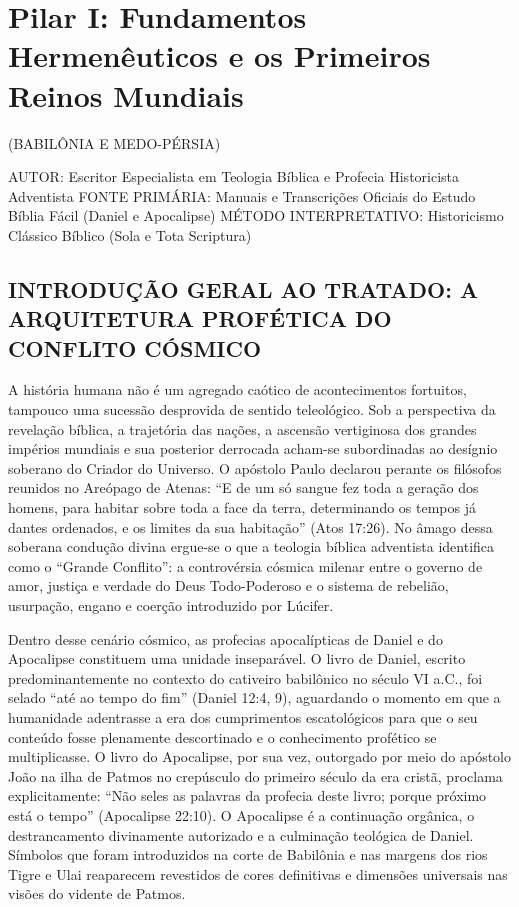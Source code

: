 \chapter{Pilar I: Fundamentos Hermenêuticos e os Primeiros Reinos Mundiais}




(BABILÔNIA E MEDO-PÉRSIA)

AUTOR: Escritor Especialista em Teologia Bíblica e Profecia Historicista Adventista
FONTE PRIMÁRIA: Manuais e Transcrições Oficiais do Estudo Bíblia Fácil (Daniel e Apocalipse)
MÉTODO INTERPRETATIVO: Historicismo Clássico Bíblico (Sola e Tota Scriptura)


\section{INTRODUÇÃO GERAL AO TRATADO: A ARQUITETURA PROFÉTICA DO CONFLITO CÓSMICO}


A história humana não é um agregado caótico de acontecimentos fortuitos, tampouco uma sucessão desprovida de sentido teleológico. Sob a perspectiva da revelação bíblica, a trajetória das nações, a ascensão vertiginosa dos grandes impérios mundiais e sua posterior derrocada acham-se subordinadas ao desígnio soberano do Criador do Universo. O apóstolo Paulo declarou perante os filósofos reunidos no Areópago de Atenas: ``E de um só sangue fez toda a geração dos homens, para habitar sobre toda a face da terra, determinando os tempos já dantes ordenados, e os limites da sua habitação'' (Atos 17:26). No âmago dessa soberana condução divina ergue-se o que a teologia bíblica adventista identifica como o ``Grande Conflito'': a controvérsia cósmica milenar entre o governo de amor, justiça e verdade do Deus Todo-Poderoso e o sistema de rebelião, usurpação, engano e coerção introduzido por Lúcifer.

Dentro desse cenário cósmico, as profecias apocalípticas de Daniel e do Apocalipse constituem uma unidade inseparável. O livro de Daniel, escrito predominantemente no contexto do cativeiro babilônico no século VI a.C., foi selado ``até ao tempo do fim'' (Daniel 12:4, 9), aguardando o momento em que a humanidade adentrasse a era dos cumprimentos escatológicos para que o seu conteúdo fosse plenamente descortinado e o conhecimento profético se multiplicasse. O livro do Apocalipse, por sua vez, outorgado por meio do apóstolo João na ilha de Patmos no crepúsculo do primeiro século da era cristã, proclama explicitamente: ``Não seles as palavras da profecia deste livro; porque próximo está o tempo'' (Apocalipse 22:10). O Apocalipse é a continuação orgânica, o destrancamento divinamente autorizado e a culminação teológica de Daniel. Símbolos que foram introduzidos na corte de Babilônia e nas margens dos rios Tigre e Ulai reaparecem revestidos de cores definitivas e dimensões universais nas visões do vidente de Patmos.

